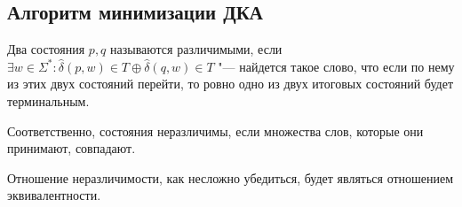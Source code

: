 \subsection{Алгоритм минимизации ДКА}
\begin{Def}
Два состояния $p, q$ называются различимыми, если $\exists w \in \Sigma^*: \hat \delta(p,  w) \in T \oplus \hat \delta(q, w) \in T$ "---
найдется такое слово, что если по нему из этих двух состояний перейти, то ровно одно из двух итоговых состояний будет терминальным.

Соответственно, состояния неразличимы, если множества слов, которые они принимают, совпадают.
\end{Def}
\begin{Rem}
Отношение неразличимости, как несложно убедиться, будет являться отношением эквивалентности.
\end{Rem}

